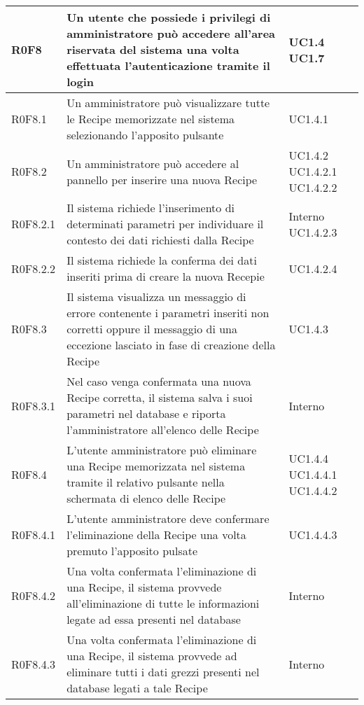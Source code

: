\begin{center}
\begin{longtable}{| p{2cm} | p{8cm} | p{2cm} |}
		\hline
		R0F8  &  Un utente che possiede i privilegi di amministratore può accedere all'area riservata del sistema una volta effettuata l'autenticazione tramite il login  &  UC1.4 \newline UC1.7 \\
		\hline
		R0F8.1  &  Un amministratore può visualizzare tutte le Recipe memorizzate nel sistema selezionando l'apposito pulsante  &  UC1.4.1 \\
		\hline
		R0F8.2  &  Un amministratore può accedere al pannello per inserire una nuova Recipe  &  UC1.4.2 \newline UC1.4.2.1 \newline UC1.4.2.2  \\
		\hline
		R0F8.2.1  &  Il sistema richiede l'inserimento di determinati parametri per individuare il contesto dei dati richiesti dalla Recipe  &  Interno \newline UC1.4.2.3 \\
		\hline
		R0F8.2.2  &  Il sistema richiede la conferma dei dati inseriti prima di creare la nuova Recepie  &  UC1.4.2.4 \\
		\hline
		R0F8.3  &  Il sistema visualizza un messaggio di errore contenente i parametri inseriti non corretti oppure il messaggio di una eccezione lasciato in fase di creazione della Recipe  &  UC1.4.3 \\
		\hline
		R0F8.3.1  &  Nel caso venga confermata  una nuova Recipe corretta, il sistema salva i suoi parametri nel database  e riporta l'amministratore all'elenco delle Recipe  &  Interno \\
		\hline
		R0F8.4  &  L'utente amministratore può eliminare una Recipe memorizzata nel sistema tramite il relativo pulsante nella schermata di elenco delle Recipe  &  UC1.4.4 \newline UC1.4.4.1 \newline UC1.4.4.2 \\
		\hline
		R0F8.4.1  &  L'utente amministratore deve confermare l'eliminazione della Recipe una volta premuto l'apposito pulsate  &  UC1.4.4.3 \\
		\hline
		R0F8.4.2  &  Una volta confermata l'eliminazione di una Recipe, il sistema provvede all'eliminazione di tutte le informazioni legate ad essa presenti nel database  &  Interno \\
		\hline
		R0F8.4.3  &  Una volta confermata l'eliminazione di una Recipe, il sistema provvede ad eliminare tutti i dati grezzi presenti nel database legati a tale Recipe  &  Interno \\

\end{longtable}
\end{center}
